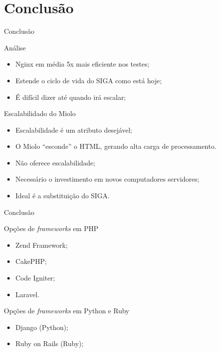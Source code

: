 \section{Conclusão}\label{sec:conclusao}

\begin{frame}{Conclusão}
	\begin{block}{Análise}
		\begin{itemize}
			\item Nginx em média 5x mais eficiente nos testes; \pause
			\item Estende o ciclo de vida do SIGA como está hoje; \pause
			\item É difícil dizer até quando irá escalar; \pause
		\end{itemize}
	\end{block}
	\begin{block}{Escalabilidado do Miolo}
		\begin{itemize}
			\item Escalabilidade é um atributo desejável; \pause
			\item O Miolo ``esconde'' o HTML, gerando alta carga de 
			processamento. \pause
			\item Não oferece escalabilidade; \pause
			\item Necessário o investimento em novos computadores servidores; 
			\pause
			\item Ideal é a substituição do SIGA.
		\end{itemize}
	\end{block}
\end{frame}

\begin{frame}{Conclusão}
	\begin{block}{Opções de \textit{frameworks} em PHP}
		\begin{itemize}
			\item Zend Framework;
			\item CakePHP;
			\item Code Igniter;
			\item Laravel.
		\end{itemize}
	\end{block} \pause
	\begin{block}{Opções de \textit{frameworks} em Python e Ruby}
		\begin{itemize}
			\item Django (Python);
			\item Ruby on Rails (Ruby);
		\end{itemize}
	\end{block}
\end{frame}


